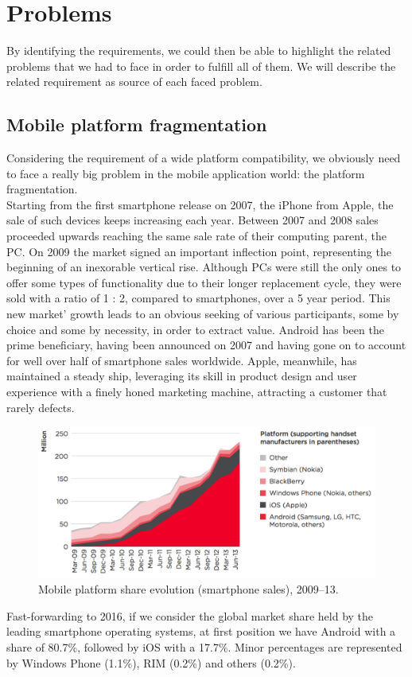 
\chapter{Problems}
\label{Chapter6} 
By identifying  the requirements, we could then be able to highlight the related problems that we had to face in order to fulfill all of them. We will describe the related requirement as source of each faced problem.

\section{Mobile platform fragmentation}
Considering the requirement of a wide platform compatibility, we obviously need to face a really big problem in the mobile application world: the platform fragmentation.\\
Starting from the first smartphone release on 2007, the iPhone from Apple,  the sale of such devices keeps increasing each year. Between 2007 and 2008 sales proceeded upwards reaching the same sale rate of their computing parent, the PC. On 2009  the market signed an important inflection point, representing the beginning of an inexorable vertical rise. Although PCs were still the only ones to offer some types of functionality due to their longer replacement cycle, they were sold with a ratio of 1 : 2, compared to smartphones, over a 5 year period. This new market’ growth leads to an obvious seeking of various participants, some by choice and some by necessity, in order to extract value. Android has been the prime beneficiary, having been announced on 2007 and having gone on to account for well over half of smartphone sales worldwide. Apple, meanwhile, has maintained a steady ship, leveraging its skill in product design and user experience with a finely honed marketing machine, attracting a customer that rarely defects.\cite{ref5}
\begin{figure}[ht!]
	\centering
	\includegraphics[width=120mm]{figures/ch6/1.png}
	\caption{Mobile platform share evolution (smartphone sales), 2009–13.}
	\label{fig6.1}
\end{figure}
Fast-forwarding to 2016, if we consider the global market share held by the leading smartphone operating systems, at first position we have Android with a share of  80.7\%, followed by iOS with a 17.7\%. Minor percentages are represented by Windows Phone (1.1\%), RIM (0.2\%) and others (0.2\%).\cite{ref6}

